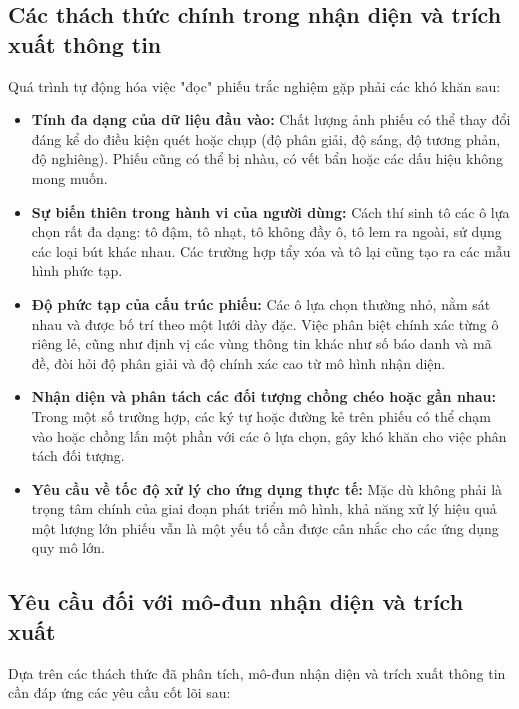 \subsection{Các thách thức chính trong nhận diện và trích xuất thông tin}
\label{ssec:thach_thuc_nhan_dien}

Quá trình tự động hóa việc "đọc" phiếu trắc nghiệm gặp phải các khó khăn sau:

\begin{itemize}
    \item \textbf{Tính đa dạng của dữ liệu đầu vào:}
    Chất lượng ảnh phiếu có thể thay đổi đáng kể do điều kiện quét hoặc chụp (độ phân giải, độ sáng, độ tương phản, độ nghiêng). Phiếu cũng có thể bị nhàu, có vết bẩn hoặc các dấu hiệu không mong muốn.

    \item \textbf{Sự biến thiên trong hành vi của người dùng:}
    Cách thí sinh tô các ô lựa chọn rất đa dạng: tô đậm, tô nhạt, tô không đầy ô, tô lem ra ngoài, sử dụng các loại bút khác nhau. Các trường hợp tẩy xóa và tô lại cũng tạo ra các mẫu hình phức tạp.

    \item \textbf{Độ phức tạp của cấu trúc phiếu:}
    Các ô lựa chọn thường nhỏ, nằm sát nhau và được bố trí theo một lưới dày đặc. Việc phân biệt chính xác từng ô riêng lẻ, cũng như định vị các vùng thông tin khác như số báo danh và mã đề, đòi hỏi độ phân giải và độ chính xác cao từ mô hình nhận diện.

    \item \textbf{Nhận diện và phân tách các đối tượng chồng chéo hoặc gần nhau:}
    Trong một số trường hợp, các ký tự hoặc đường kẻ trên phiếu có thể chạm vào hoặc chồng lấn một phần với các ô lựa chọn, gây khó khăn cho việc phân tách đối tượng.

    \item \textbf{Yêu cầu về tốc độ xử lý cho ứng dụng thực tế:}
    Mặc dù không phải là trọng tâm chính của giai đoạn phát triển mô hình, khả năng xử lý hiệu quả một lượng lớn phiếu vẫn là một yếu tố cần được cân nhắc cho các ứng dụng quy mô lớn.
\end{itemize}

\subsection{Yêu cầu đối với mô-đun nhận diện và trích xuất}
\label{ssec:yeu_cau_module}

Dựa trên các thách thức đã phân tích, mô-đun nhận diện và trích xuất thông tin cần đáp ứng các yêu cầu cốt lõi sau:

